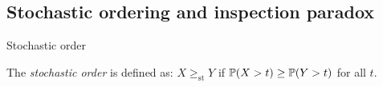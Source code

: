 \subsection{Stochastic ordering and inspection paradox}

%
\begin{note}
  \begin{field}
    Stochastic order
  \end{field}
  \begin{field}
    \begin{defi}
      The \emph{stochastic order} is defined as: $X \geq_{\mathrm{st}} Y$ if $\P(X > t) \geq \P(Y > t)$ for all $t$.
    \end{defi}
  \end{field}
  \xplain{}%
\end{note}

